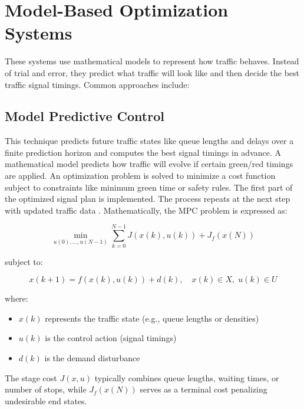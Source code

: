 \documentclass[11pt, a4paper]{report}
\begin{document}
\section{Model-Based Optimization Systems}

These systems use mathematical models to represent how traffic behaves. Instead of trial and error, they predict what traffic will look like and then decide the best traffic signal timings. Common approaches include:

\subsection{Model Predictive Control}

This technique predicts future traffic states like queue lengths and delays over a finite prediction horizon and computes the best signal timings in advance. A mathematical model predicts how traffic will evolve if certain green/red timings are applied. An optimization problem is solved to minimize a cost function subject to constraints like minimum green time or safety rules. The first part of the optimized signal plan is implemented. The process repeats at the next step with updated traffic data \cite{8707103}. Mathematically, the MPC problem is expressed as:

\begin{equation}
\min_{u(0), \dots, u(N-1)} \sum_{k=0}^{N-1} J(x(k), u(k)) + J_f(x(N))
\label{eq:mpc-objective}
\end{equation}

subject to:

\begin{equation}
x(k+1) = f(x(k), u(k)) + d(k), \quad x(k) \in X, \; u(k) \in U
\label{eq:mpc-constraint}
\end{equation}

where:

\begin{itemize}
    \item $x(k)$ represents the traffic state (e.g., queue lengths or densities)
    \item $u(k)$ is the control action (signal timings)
    \item $d(k)$ is the demand disturbance
\end{itemize}

The stage cost $J(x,u)$ typically combines queue lengths, waiting times, or number of stops, while $J_f(x(N))$ serves as a terminal cost penalizing undesirable end states.
\end{document}
